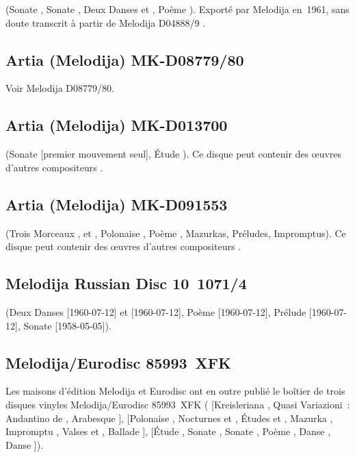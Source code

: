 \Scriabine{} (Sonate , Sonate , Deux Danses 
 et  , Poème ).
Exporté par Melodija en~1961, sans doute transcrit à partir de Melodija
D04888/9 \citep[voir][p.~94]{White}.

\subsection{Artia (Melodija) MK-D08779/80}

Voir Melodija D08779/80.

\subsection{Artia (Melodija) MK-D013700}

\Scriabine{} (Sonate  [premier mouvement seul], Étude 
).
Ce disque peut contenir des œuvres d'autres compositeurs \citep[voir][p.~94,
note~9]{White}.

\subsection{Artia (Melodija) MK-D091553}

\Scriabine{} (Trois Morceaux  ,   et
 , Polonaise , Poème , Mazurkas,
Préludes, Impromptus).
Ce disque peut contenir des œuvres d'autres compositeurs \citep[voir][p.~94,
note~10]{White}.

\subsection{Melodija Russian Disc 10~1071/4}

\Scriabine{} (Deux Danses   [1960-07-12] et 
 [1960-07-12], Poème   [1960-07-12], Prélude
  [1960-07-12], Sonate  [1958-05-05]).

\subsection{Melodija/Eurodisc 85993~XFK}

Les maisons d'édition Melodija et Eurodisc ont en outre publié le boîtier de
trois disques vinyles Melodija/Eurodisc 85993~XFK (\Schumann{} [Kreisleriana
, Quasi Variazioni~: Andantino de \CWieck{} ,
Arabesque ], \Chopin{} [Polonaise  , Nocturnes
  et  , Études   et
 , Mazurka  , Impromptu ,
Valses   et  , Ballade ],
\Scriabine{} [Étude  , Sonate , Sonate
, Poème  , Danse 
 , Danse   ]).

